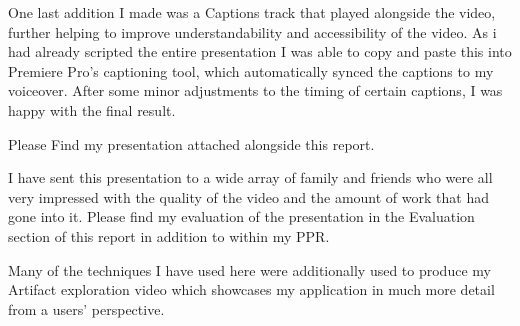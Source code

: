 One last addition I made was a Captions track that played alongside the video, further helping to improve understandability and accessibility of the video. As i had already scripted the entire presentation I was able to copy and paste this into Premiere Pro's captioning tool, which automatically synced the captions to my voiceover. After some minor adjustments to the timing of certain captions, I was happy with the final result.

Please Find my presentation attached alongside this report.

I have sent this presentation to a wide array of family and friends who were all very impressed with the quality of the video and the amount of work that had gone into it. Please find my evaluation of the presentation in the Evaluation section of this report in addition to within my PPR.

Many of the techniques I have used here were additionally used to produce my Artifact exploration video which showcases my application in much more detail from a users' perspective.